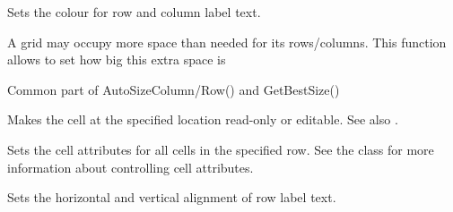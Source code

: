 \label{wxgridsetlabeltextcolour}


Sets the colour for row and column label text.



\label{wxgridsetmargins}


A grid may occupy more space than needed for its rows/columns. This
function allows to set how big this extra space is



\label{wxgridsetorcalccolumnsizes}


Common part of AutoSizeColumn/Row() and GetBestSize()



\label{wxgridsetorcalcrowsizes}




\label{wxgridsetreadonly}


Makes the cell at the specified location read-only or editable.
See also .



\label{wxgridsetrowattr}


Sets the cell attributes for all cells in the specified row.
See the  class for more information
about controlling cell attributes.



\label{wxgridsetrowlabelalignment}


Sets the horizontal and vertical alignment of row label text.

